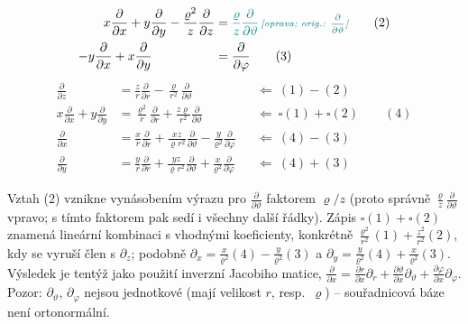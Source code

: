 \begin{priklad}
\begin{align}
  x\frac{\partial}{\partial x} + y\frac{\partial}{\partial y} - \frac{\varrho^2}{z}\frac{\partial}{\partial z} &= \oprava{\frac{\varrho}{z}\frac{\partial}{\partial\vartheta}}{\frac{\partial}{\partial\vartheta}} \tag{2}\\
  -y\frac{\partial}{\partial x} + x\frac{\partial}{\partial y} \hspace{1.75cm} &= \frac{\partial}{\partial\varphi} \tag{3}
\end{align}
\begin{align*}
  \frac{\partial}{\partial z} &= \frac{z}{r}\frac{\partial}{\partial r} - \frac{\varrho}{r^2}\frac{\partial}{\partial\vartheta} && \Leftarrow\ (1) - (2) \\
  x\frac{\partial}{\partial x} + y\frac{\partial}{\partial y} &= \frac{\varrho^2}{r}\frac{\partial}{\partial r} + \frac{z\varrho}{r^2}\frac{\partial}{\partial\vartheta} && \Leftarrow\ \square(1) + \square(2) \qquad (4) \\
  \frac{\partial}{\partial x} &= \frac{x}{r}\frac{\partial}{\partial r} + \frac{xz}{\varrho r^2}\frac{\partial}{\partial\vartheta} - \frac{y}{\varrho^2}\frac{\partial}{\partial\varphi} && \Leftarrow\ (4) - (3) \\
  \frac{\partial}{\partial y} &= \frac{y}{r}\frac{\partial}{\partial r} + \frac{yz}{\varrho r^2}\frac{\partial}{\partial\vartheta} + \frac{x}{\varrho^2}\frac{\partial}{\partial\varphi} && \Leftarrow\ (4) + (3)
\end{align*}
\end{priklad}

\begin{vysvetleni}
Vztah (2) vznikne vynásobením výrazu pro $\frac{\partial}{\partial\vartheta}$ faktorem $\varrho/z$ (proto správně $\frac{\varrho}{z}\frac{\partial}{\partial\vartheta}$ vpravo; s tímto faktorem pak sedí i všechny další řádky). Zápis $\square(1)+\square(2)$ znamená lineární kombinaci s vhodnými koeficienty, konkrétně $\frac{\varrho^2}{r^2}(1)+\frac{z^2}{r^2}(2)$, kdy se vyruší člen s $\partial_z$; podobně $\partial_x=\frac{x}{\varrho^2}(4)-\frac{y}{\varrho^2}(3)$ a $\partial_y=\frac{y}{\varrho^2}(4)+\frac{x}{\varrho^2}(3)$. Výsledek je tentýž jako použití inverzní Jacobiho matice, $\frac{\partial}{\partial x}=\frac{\partial r}{\partial x}\partial_r+\frac{\partial\vartheta}{\partial x}\partial_\vartheta+\frac{\partial\varphi}{\partial x}\partial_\varphi$. Pozor: $\partial_\vartheta$, $\partial_\varphi$ nejsou jednotkové (mají velikost $r$, resp.\ $\varrho$) -- souřadnicová báze není ortonormální.
\end{vysvetleni}

